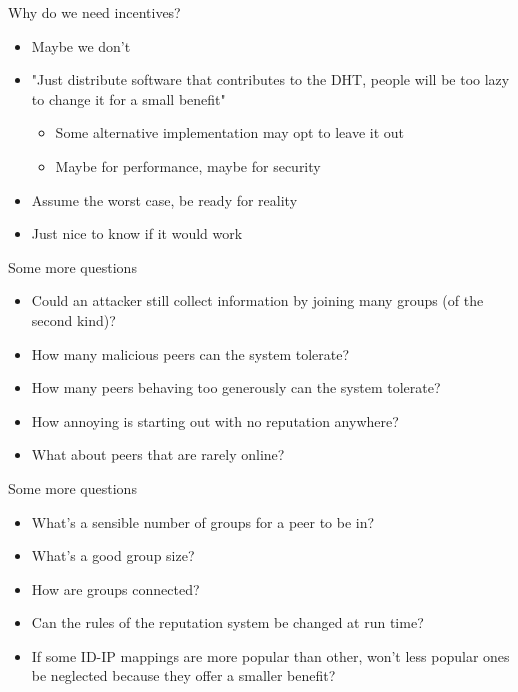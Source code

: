 \documentclass[presentation,english,usenames,dvipsnames]{beamer}
\begin{document}
\begin{frame}{Why do we need incentives?}
  \begin{itemize}
    \item Maybe we don't
    \item "Just distribute software that contributes to the DHT, people will be
          too lazy to change it for a small benefit"
          \begin{itemize}
            \item Some alternative implementation may opt to leave it out
            \item Maybe for performance, maybe for security
          \end{itemize}
    \item Assume the worst case, be ready for reality
    \item Just nice to know if it would work
  \end{itemize}
\end{frame}

\begin{frame}{Some more questions}
  \begin{itemize}
    \item Could an attacker still collect information by joining many groups (of
          the second kind)?
    \item How many malicious peers can the system tolerate?
    \item How many peers behaving too generously can the system tolerate?
    \item How annoying is starting out with no reputation anywhere?
    \item What about peers that are rarely online?
  \end{itemize}
\end{frame}

\begin{frame}{Some more questions}
  \begin{itemize}
    \item What's a sensible number of groups for a peer to be in?
    \item What's a good group size?
    \item How are groups connected?
    \item Can the rules of the reputation system be changed at run time?
    \item If some ID-IP mappings are more popular than other, won't less popular
          ones be neglected because they offer a smaller benefit?
  \end{itemize}
\end{frame}
\end{document}
